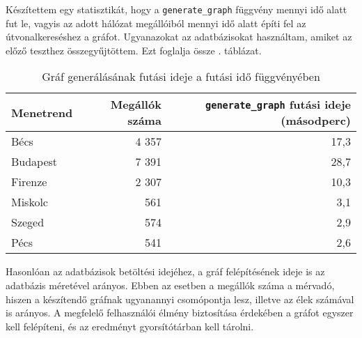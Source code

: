Készítettem egy statisztikát, hogy a \texttt{generate\_graph} függvény mennyi idő alatt fut le, vagyis az adott hálózat megállóiból mennyi idő alatt építi fel az útvonalkereséshez a gráfot. Ugyanazokat az adatbázisokat használtam, amiket az előző teszthez összegyűjtöttem. Ezt foglalja össze . táblázat.

\begin{table}
\centering
\begin{tabular}{|l|r|r|}
\hline
Menetrend & Megállók száma & \texttt{generate\_graph} futási ideje (másodperc) \\
\hline
Bécs & 4 357 & 17,3 \\
\hline
Budapest & 7 391 & 28,7 \\
\hline
Firenze & 2 307 & 10,3 \\
\hline
Miskolc & 561 & 3,1 \\
\hline
Szeged & 574 & 2,9 \\
\hline
Pécs & 541 & 2,6 \\
\hline
\end{tabular}
\caption{Gráf generálásának futási ideje a futási idő függvényében}
\label{tab:runtime}
\end{table}

Hasonlóan az adatbázisok betöltési idejéhez, a gráf felépítésének ideje is az adatbázis méretével arányos. Ebben az esetben a megállók száma a mérvadó, hiszen a készítendő gráfnak ugyanannyi csomópontja lesz, illetve az élek számával is arányos. A megfelelő felhasználói élmény biztosítása érdekében a gráfot egyszer kell felépíteni, és az eredményt gyorsítótárban kell tárolni.
